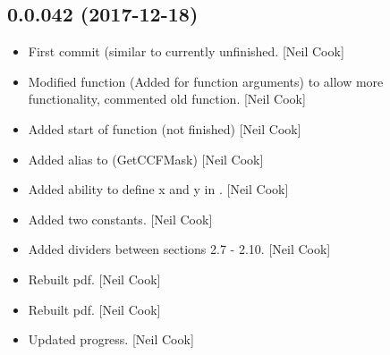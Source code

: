 \documentclass[a4paper,10pt,english]{report}
\begin{document}
\subsection{0.0.042 (2017-12-18)}
\label{\detokenize{misc/changelog:id510}}\begin{itemize}
\item {} 
First commit (similar to  \textendash{} currently unfinished.
{[}Neil Cook{]}

\item {} 
Modified  function (Added for function
arguments) to allow more functionality, commented old function. {[}Neil
Cook{]}

\item {} 
Added start of  function (not finished) {[}Neil Cook{]}

\item {} 
Added alias to  (GetCCFMask) {[}Neil Cook{]}

\item {} 
Added ability to define x and y in . {[}Neil
Cook{]}

\item {} 
Added two  constants. {[}Neil Cook{]}

\item {} 
Added dividers between sections 2.7 - 2.10. {[}Neil Cook{]}

\item {} 
Rebuilt pdf. {[}Neil Cook{]}

\item {} 
Rebuilt pdf. {[}Neil Cook{]}

\item {} 
Updated progress. {[}Neil Cook{]}

\end{itemize}
\end{document}
